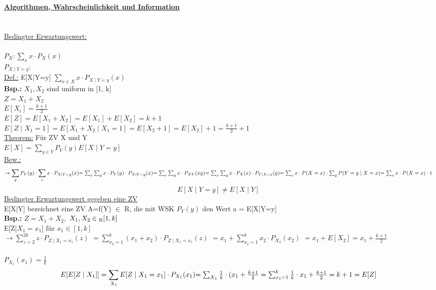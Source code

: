 \documentclass{article}
\begin{document}
 	\textbf{\underline{Algorithmen, Wahrscheinlichkeit und Information}}
 	\\ \\ \\
 	\underline{Bedingter Erwartungswert:} \\
 	\\
 	$P_X : \sum_{x} x \cdot P_X (x)$ \\
 	$P_{X\mid Y = y} :$ \\
 	\underline{Def.:} E[X$\mid$Y=y] $\sum_{x\in X} x \cdot P_{X\mid Y=y}(x)$ \\
 	\textbf{Bsp.:} $X_1, X_2$ sind uniform in [1, k] \\
 	$Z = X_1 + X_2$ \\
 	$E[X_i] = \frac{k+1}{2}$ \\
 	$E[Z] = E[X_1 + X_2] = E[X_1] + E[X_2] = k+1$ \\
 	$E[Z\mid X_1=1] = E[X_1+X_2\mid X_1=1] = E[X_2+1] = E[X_2]+1= \frac{k+1}{2}+1$ \\
 	\underline{Theorem:} Für ZV X und Y \\
 	$E[X] = \sum_{y\in Y} P_Y (y) E[X\mid Y=y]$\\
 	\underline{Bew.:}
	\[
		\rightarrow \sum_{y}P_Y(y) \cdot  \sum_{x} x \cdot P_{X\mid Y=y}(x) $$ $$
		=\sum_{x} \sum_{y} x \cdot P_Y(y) \cdot P_{X\mid Y=y}(x) $$ $$
		=\sum_{x} \sum_{y} x \cdot P_{XY}(xy) $$ $$
		=\sum_{x} \sum_{y} x \cdot P_X(x) \cdot P_{Y\mid X=x}(y) $$ $$
		=\sum_{x} x \cdot P(X=x) \cdot \sum_{y} P(Y=y\mid X=x) $$ $$
		=\sum_{x} x \cdot P(X=x) \cdot 1
	\]
	\[
	E[X\mid Y=y] \neq E[X\mid Y]
	\]
	\underline{Bedingter Erwartungswert gegeben eine ZV} \\
	E[X$\mid$Y] bezeichnet eine ZV A=f(Y) $\in$ R, die mit WSK $P_Y(y)$ den Wert a = E[X$\mid$Y=y] \\
	\textbf{Bsp.:} $Z = X_1 + X_2,$ $X_1,X_2 \in\textsubscript{R} [1,k]$ \\
	E[Z$\mid X_1=x_1$] für $x_1 \in [1,k]$ \\
	$\rightarrow \sum_{z=2}^{2k} z \cdot P_{Z\mid X_1 = x_1}(z)$ 
	$=\sum_{x_2=1}^{k}(x_1+x_2) \cdot P_{Z\mid X_1 = x_1}(z)$
	$=x_1 + \sum_{x_2=1}^{k} x_2 \cdot P_{X_2}(x_2)$
	$=x_1 + E[X_2] = x_1 + \frac{k+1}{2}$ \\
	\\
	$P_{X_1}(x_1) = \frac{1}{k}$\\
	\[
	E[E[Z\mid X_1]] = \sum_{X_1} E[Z\mid X_1=x_1]\cdot P_{X_1}(x_1) $$ $$
	= \sum_{X_1} \frac{1}{k} \cdot (x_1 + \frac{k+1}{2}
	= \sum_{x_1=1}^{k} \frac{1}{k} \cdot x_1 + \frac{k+1}{2}
	= k + 1 = E[Z]
	\]
\end{document}
